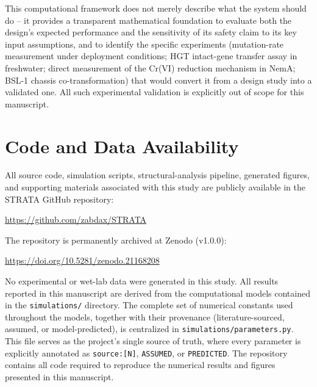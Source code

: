 \documentclass[10pt,twocolumn,letterpaper,
              colorlinks=true,
              linkcolor=blue!70!black,
              citecolor=blue!70!black,
              urlcolor=blue!70!black,
              pdfborder={0 0 0}]{article}
\begin{document}
This computational framework does not merely describe what the system
should do -- it provides a transparent mathematical foundation to evaluate
both the design's expected performance and the sensitivity of its safety
claim to its key input assumptions, and to identify the specific
experiments (mutation-rate measurement under deployment conditions; HGT
intact-gene transfer assay in freshwater; direct measurement of the
Cr(VI) reduction mechanism in NemA; BSL-1 chassis co-transformation)
that would convert it from a design study into a validated one. All such
experimental validation is explicitly out of scope for this manuscript.

\section{Code and Data Availability}

All source code, simulation scripts, structural-analysis pipeline,
generated figures, and supporting materials associated with this study
are publicly available in the STRATA GitHub repository:
\begin{center}
\url{https://github.com/zabdax/STRATA}
\end{center}
The repository is permanently archived at Zenodo (v1.0.0):
\begin{center}
\url{https://doi.org/10.5281/zenodo.21168208}
\end{center}
No experimental or wet-lab data were generated in this study. All
results reported in this manuscript are derived from the computational
models contained in the \texttt{simulations/} directory.
The complete set of numerical constants used throughout the models,
together with their provenance (literature-sourced, assumed, or
model-predicted), is centralized in
\texttt{simulations/parameters.py}. This file serves as the project's
single source of truth, where every parameter is explicitly annotated as
\texttt{source:[N]}, \texttt{ASSUMED}, or \texttt{PREDICTED}.
The repository contains all code required to reproduce the numerical
results and figures presented in this manuscript.
\end{document}
